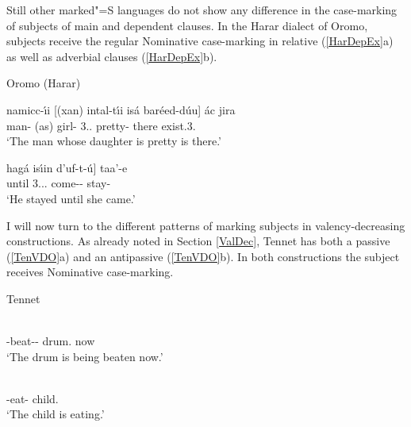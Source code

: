 Still other marked"=S languages do not show any difference in the case-marking of subjects of main and dependent clauses.
In the Harar dialect of Oromo, subjects receive the regular Nominative  case-marking in relative (\ref{HarDepEx}a) as well as adverbial clauses (\ref{HarDepEx}b).

\pagebreak
\begin{exe} \ex\label{HarDepEx}  {Oromo (Harar)} \citep[Eastern Cushitic; Ethiopia; ][131, 143]{Owens:1985}\nopagebreak[4]
\begin{xlist}
\ex\gll namicc-\'\i i  {\rm[}(xan) intal-t\'\i i is\'a bar\'eed-d\'uu{\rm]} \'ac jira\\
man-\nom{} (as) girl-\nom{} 3\sg{}.\mas{}.\acc{} pretty-\fem{} there exist.3\sg{}.\mas{}\\
`The man whose daughter is pretty is there.'

\ex\gll  {\rm[}hag\'a is\'\i in d'uf-t-\'u{\rm]} taa'-e\\
until 3.\sg{}.\fem{}.\nom{} come-\fem{}-\dep{} stay-\pst{}\\
`He stayed until she came.'
\end{xlist}
\end{exe} 

I will now turn to the different patterns of marking subjects in valency-de\-crea\-sing constructions.  
As already noted in Section \ref{ValDec},  
Tennet has both a passive (\ref{TenVDO}a) and an antipassive (\ref{TenVDO}b). 
In both constructions the subject receives Nominative  case-marking. 

\begin{exe}\ex\label{TenVDO} {Tennet} \citep[Surmic; Sudan; ][245]{Randal:1998}\nopagebreak[4]
\begin{xlist}
\ex\gll{}  \\
\ipfv{}-beat-\epen{}-\pass{} drum.\nom{} now\\
`The drum is being beaten now.' 

\ex\gll{} \\
\ipfv{}-eat-\antip{} child.\nom{}\\
`The child is eating.' 

\end{xlist}
\end{exe}


